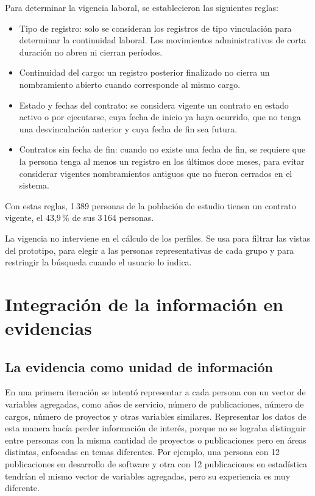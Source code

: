 Para determinar la vigencia laboral, se establecieron las siguientes reglas:
\begin{itemize}
\item Tipo de registro: solo se consideran los registros de tipo vinculación para determinar la continuidad laboral. Los movimientos administrativos de corta duración no abren ni cierran períodos.
\item Continuidad del cargo: un registro posterior finalizado no cierra un nombramiento abierto cuando corresponde al mismo cargo.
\item Estado y fechas del contrato: se considera vigente un contrato en estado activo o por ejecutarse, cuya fecha de inicio ya haya ocurrido, que no tenga una desvinculación anterior y cuya fecha de fin sea futura.
\item Contratos sin fecha de fin: cuando no existe una fecha de fin, se requiere que la persona tenga al menos un registro en los últimos doce meses, para evitar considerar vigentes nombramientos antiguos que no fueron cerrados en el sistema.
\end{itemize}

Con estas reglas, 1\,389 personas de la población de estudio tienen un contrato vigente, el 43,9\,\% de sus 3\,164 personas.

La vigencia no interviene en el cálculo de los perfiles. Se usa para filtrar las vistas del prototipo, para elegir a las personas representativas de cada grupo y para restringir la búsqueda cuando el usuario lo indica.

\section{Integración de la información en evidencias}
\label{sec:met_evidencias}

\subsection{La evidencia como unidad de información}

En una primera iteración se intentó representar a cada persona con un vector de variables agregadas, como años de servicio, número de publicaciones, número de cargos, número de proyectos y otras variables similares. Representar los datos de esta manera hacía perder información de interés, porque no se lograba distinguir entre personas con la misma cantidad de proyectos o publicaciones pero en áreas distintas, enfocadas en temas diferentes. Por ejemplo, una persona con 12 publicaciones en desarrollo de software y otra con 12 publicaciones en estadística tendrían el mismo vector de variables agregadas, pero su experiencia es muy diferente.

